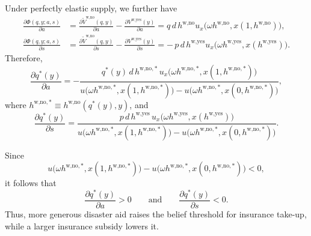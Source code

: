 \documentclass{article}
\begin{document}
Under perfectly elastic supply, we further have
\begin{align}
\frac{\partial \Phi(q,y;a,s)}{\partial a}
&=
\frac{\partial \tilde V^{\text{w,no}}(q,y)}{\partial a}
-
\frac{\partial V^{\text{w,yes}}(y)}{\partial a}
=
q\,d\,h^{\text{w,no}}
u_x\big(\omega h^{\text{w,no}},x(1,h^{\text{w,no}})\big),
\\
\frac{\partial \Phi(q,y;a,s)}{\partial s}
&=
\frac{\partial \tilde V^{\text{w,no}}(q,y)}{\partial s}
-
\frac{\partial V^{\text{w,yes}}(y)}{\partial s}
=
-\,p\,d\,h^{\text{w,yes}}
u_x\big(\omega h^{\text{w,yes}},x(h^{\text{w,yes}})\big).
\end{align}
Therefore,
\begin{equation}
\frac{\partial q^{*}(y)}{\partial a}
=
-
\frac{
q^{*}(y)\,d\,h^{\text{w,no},*}\,
u_x\big(\omega h^{\text{w,no},*},x(1,h^{\text{w,no},*})\big)
}{
u\big(\omega h^{\text{w,no},*},x(1,h^{\text{w,no},*})\big)
-
u\big(\omega h^{\text{w,no},*},x(0,h^{\text{w,no},*})\big)
},
\end{equation}
where $h^{\text{w,no},*}\equiv h^{\text{w,no}}(q^{*}(y),y)$, and
\begin{equation}
\frac{\partial q^{*}(y)}{\partial s}
=
\frac{
p\,d\,h^{\text{w,yes}}\,
u_x\big(\omega h^{\text{w,yes}},x(h^{\text{w,yes}})\big)
}{
u\big(\omega h^{\text{w,no},*},x(1,h^{\text{w,no},*})\big)
-
u\big(\omega h^{\text{w,no},*},x(0,h^{\text{w,no},*})\big)
}.
\end{equation}

Since
\[
u\big(\omega h^{\text{w,no},*},x(1,h^{\text{w,no},*})\big)
-
u\big(\omega h^{\text{w,no},*},x(0,h^{\text{w,no},*})\big)<0,
\]
it follows that
\[
\frac{\partial q^{*}(y)}{\partial a}>0
\qquad\text{and}\qquad
\frac{\partial q^{*}(y)}{\partial s}<0.
\]
Thus, more generous disaster aid raises the belief threshold for insurance take-up, while a larger insurance subsidy lowers it.
\end{document}

